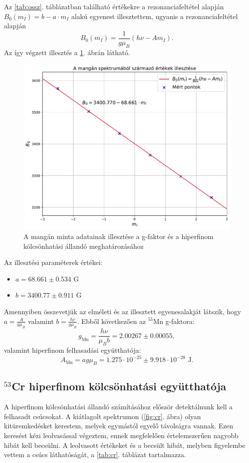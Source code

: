 \documentclass[12pt,a4paper]{article}
\begin{document}
\newpage
Az \ref{tab:ossz}. táblázatban található értékekre a rezonanciafeltétel alapján $B_0(m_I) = b-a\cdot m_I$ alakú egyenest illesztettem, ugyanis a rezonanciafeltétel alapján 
\begin{equation}
B_0(m_I)=\frac{1}{g\mu_B}(h\nu-Am_I).
\end{equation}
Az így végzett illesztés a \ref{fig:mn_illesztes}. ábrán látható.\\
\begin{figure}[!h]
\centering
\includegraphics[scale=0.55]{mn_hf_fit}
\caption{A mangán minta adatainak illesztése a g-faktor és a hiperfinom kölcsönhatási állandó meghatározásához}
\label{fig:mn_illesztes}
\end{figure}
\newline
Az illesztési paraméterek értékei:
\begin{itemize}
\item{$a=68.661 \pm 0.534 $ G}
\item{$b=3400.77 \pm 0.911 $ G}
\end{itemize}
Amennyiben összevetjük az elméleti és az illesztett egyenesalakját látszik, hogy $a=\frac{A}{g\mu_B}$ valamint $b=\frac{h\nu}{g\mu_B}$. Ebből következően az $^{55}$Mn g-faktora:
$$g_{\textrm{Mn}}=\frac{h\nu}{\mu_B b}=2.00267 \pm 0.00055, $$
valamint hiperfinom felhasadási együtthatója:
$$A_{\textrm{Mn}}=ag\mu_B = 1.275\cdot 10^{-25} \pm 9.918 \cdot 10^{-28} \textrm{ J}. $$

\subsection{$^{53}$Cr hiperfinom kölcsönhatási együtthatója}
\hspace*{10pt} A hiperfinom kölcsönhatási állandó számításához először detektálnunk kell a felhasadt csúcsokat. A kiátlagolt spektrumon (\ref{fig:cr}. ábra) olyan kitüremkedésket kerestem, melyek egymástól egyelő távolságra vannak. Ezen keresést kézi leolvasással végeztem, ennek megfelelően értelemszerűen nagyobb hibát kell becsülni. A leolvasott értékeket és a becsült hibát, melyben figyelembe vettem a csúcs láthatóságát, a \ref{tab:cr}. táblázat tartalmazza.\\
\end{document}
